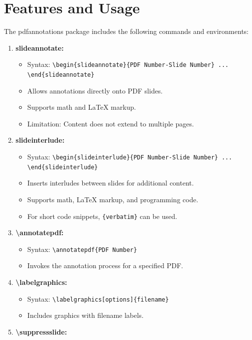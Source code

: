 \documentclass{article}
\begin{document}
\section*{Features and Usage}
The pdfannotations package includes the following commands and environments:
\begin{enumerate}
    \item \textbf{slideannotate:} 
    \begin{itemize}
        \item Syntax: \texttt{\textbackslash begin\{slideannotate\}\{PDF Number-Slide Number\} ... \textbackslash end\{slideannotate\}}
        \item Allows annotations directly onto PDF slides.
        \item Supports math and \LaTeX{} markup.
        \item Limitation: Content does not extend to multiple pages.
    \end{itemize}
    \item \textbf{slideinterlude:}
    \begin{itemize}
        \item Syntax: \texttt{\textbackslash begin\{slideinterlude\}\{PDF Number-Slide Number\} ... \textbackslash end\{slideinterlude\}}
        \item Inserts interludes between slides for additional content.
        \item Supports math, \LaTeX{} markup, and programming code.
        \item For short code snippets, \texttt{\{verbatim\}} can be used.
    \end{itemize}
    \item \textbf{\textbackslash annotatepdf:}
    \begin{itemize}
        \item Syntax: \texttt{\textbackslash annotatepdf\{PDF Number\}}
        \item Invokes the annotation process for a specified PDF.
    \end{itemize}
    \item \textbf{\textbackslash labelgraphics:}
    \begin{itemize}
        \item Syntax: \texttt{\textbackslash labelgraphics[options]\{filename\}}
        \item Includes graphics with filename labels.
    \end{itemize}
    \item \textbf{\textbackslash suppressslide:}

\end{enumerate}
\end{document}
